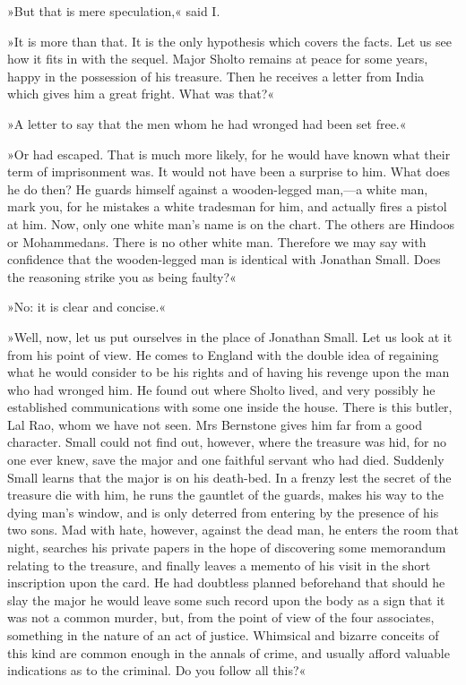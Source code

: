 »But that is mere speculation,« said I.

»It is more than that. It is the only hypothesis which covers the facts. Let us see how it fits in with the sequel. Major Sholto remains at peace for some years, happy in the possession of his treasure. Then he receives a letter from India which gives him a great fright. What was that?«

»A letter to say that the men whom he had wronged had been set free.«

»Or had escaped. That is much more likely, for he would have known what their term of imprisonment was. It would not have been a surprise to him. What does he do then? He guards himself against a wooden-legged man,—a white man, mark you, for he mistakes a white tradesman for him, and actually fires a pistol at him. Now, only one white man's name is on the chart. The others are Hindoos or Mohammedans. There is no other white man. Therefore we may say with confidence that the wooden-legged man is identical with Jonathan Small. Does the reasoning strike you as being faulty?«

»No: it is clear and concise.«

»Well, now, let us put ourselves in the place of Jonathan Small. Let us look at it from his point of view. He comes to England with the double idea of regaining what he would consider to be his rights and of having his revenge upon the man who had wronged him. He found out where Sholto lived, and very possibly he established communications with some one inside the house. There is this butler, Lal Rao, whom we have not seen. Mrs Bernstone gives him far from a good character. Small could not find out, however, where the treasure was hid, for no one ever knew, save the major and one faithful servant who had died. Suddenly Small learns that the major is on his death-bed. In a frenzy lest the secret of the treasure die with him, he runs the gauntlet of the guards, makes his way to the dying man's window, and is only deterred from entering by the presence of his two sons. Mad with hate, however, against the dead man, he enters the room that night, searches his private papers in the hope of discovering some memorandum relating to the treasure, and finally leaves a memento of his visit in the short inscription upon the card. He had doubtless planned beforehand that should he slay the major he would leave some such record upon the body as a sign that it was not a common murder, but, from the point of view of the four associates, something in the nature of an act of justice. Whimsical and bizarre conceits of this kind are common enough in the annals of crime, and usually afford valuable indications as to the criminal. Do you follow all this?«

